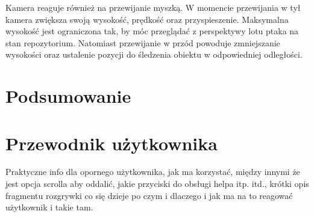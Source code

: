 \documentclass[11pt,a4paper,polish,thesis]{dcsbook}
\begin{document}
	Kamera reaguje również na przewijanie myszką. W momencie przewijania w tył kamera zwiększa swoją wysokość, prędkość oraz przyspieszenie. Maksymalna wysokość jest ograniczona tak, by móc przeglądać z perspektywy lotu ptaka na stan repozytorium. Natomiast przewijanie w przód powoduje zmniejszanie wysokości oraz ustalenie pozycji do śledzenia obiektu w odpowiedniej odległości. 	
	
	\chapter{Podsumowanie}
	
	\appendix
	
	\chapter{Przewodnik użytkownika}
	
	Praktyczne info dla opornego użytkownika, jak ma korzystać, między innymi że jest opcja scrolla aby oddalić, jakie przyciski do obsługi helpa itp. itd., krótki opis fragmentu rozgrywki co się dzieje po czym i dlaczego i jak ma na to reagować użytkownik i takie tam.
	
	\backmatter
	
\end{document}
